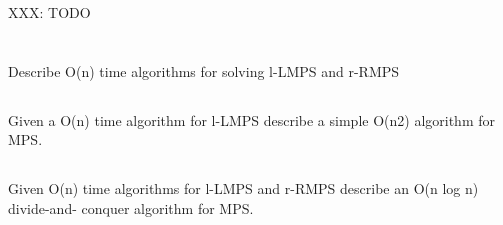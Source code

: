 \documentclass{amsart}
\theoremstyle{definition}
\theoremstyle{remark}
\numberwithin{equation}{section}
\begin{document}
XXX: TODO
\section{}

\subsection{} Describe O(n) time algorithms for solving l-LMPS and r-RMPS

\subsection{} Given a O(n) time algorithm for l-LMPS describe a simple O(n2) algorithm for MPS.

\subsection{} Given O(n) time algorithms for l-LMPS and r-RMPS describe an O(n log n) divide-and- conquer algorithm for MPS.
\end{document}
